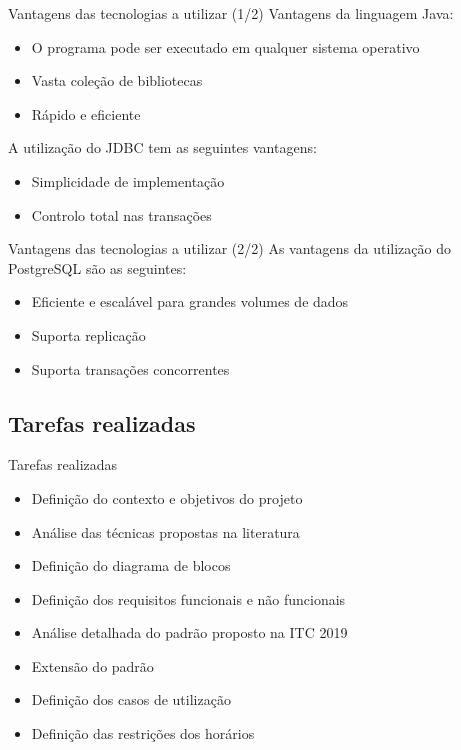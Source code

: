 \documentclass[aspectratio=169]{beamer}
\begin{document}
    \begin{frame}{Vantagens das tecnologias a utilizar (1/2)}
        \justifying
        Vantagens da linguagem Java:
        \begin{itemize}
            \item O programa pode ser executado em qualquer sistema operativo
            \item Vasta coleção de bibliotecas
            \item Rápido e eficiente
        \end{itemize} 

        \vfill

        A utilização do JDBC tem as seguintes vantagens:
        \begin{itemize}
            \item Simplicidade de implementação
            \item Controlo total nas transações
        \end{itemize}
    \end{frame}

    \begin{frame}{Vantagens das tecnologias a utilizar (2/2)}
        \justifying
        As vantagens da utilização do PostgreSQL são as seguintes:
        \begin{itemize}
            \item Eficiente e escalável para grandes volumes de dados
            \item Suporta replicação
            \item Suporta transações concorrentes
        \end{itemize}
    \end{frame}

    \subsection{Tarefas realizadas}

    \begin{frame}{Tarefas realizadas}
        \justifying

        \begin{itemize}
            \item Definição do contexto e objetivos do projeto
            \item Análise das técnicas propostas na literatura
            \item Definição do diagrama de blocos
            \item Definição dos requisitos funcionais e não funcionais
            \item Análise detalhada do padrão proposto na ITC 2019
            \item Extensão do padrão
            \item Definição dos casos de utilização
            \item Definição das restrições dos horários
        \end{itemize}

    \end{frame}
\end{document}
